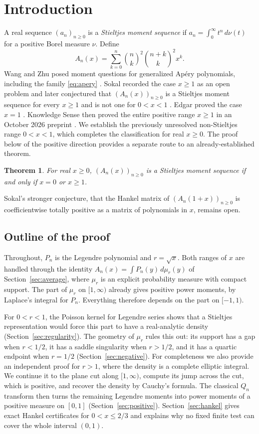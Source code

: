 \documentclass[11pt]{article}
\newtheorem{theorem}{Theorem}
\begin{document}
\section{Introduction}
A real sequence $(a_n)_{n\ge0}$ is a \emph{Stieltjes moment sequence} if
$a_n=\int_0^\infty t^n\,d\nu(t)$ for a positive Borel measure $\nu$.
Define
\begin{equation}\label{eq:apery}
 A_n(x)=\sum_{k=0}^n\binom nk^2\binom{n+k}k^2x^k.
\end{equation}
Wang and Zhu posed moment questions for generalized Ap\'ery polynomials,
including the family \eqref{eq:apery} \cite[Section 5]{WangZhu}.
Sokal recorded the case $x\ge1$ as an open problem \cite{Sokal2018} and
later conjectured that $(A_n(x))_{n\ge0}$ is a Stieltjes moment sequence
for every $x\ge1$ and is not one for $0<x<1$ \cite[slide 29]{Sokal}.
Edgar proved the case $x=1$ \cite{Edgar}. Knowledge Sense then proved
the entire positive range $x\ge1$ in an October 2026 preprint
\cite{KnowledgeSense}. We establish the previously unresolved
non-Stieltjes range $0<x<1$, which completes the classification
for real $x\ge0$. The proof below of the positive direction
provides a separate route to an already-established theorem.
\begin{theorem}\label{thm:classification}
For real $x\ge0$, $(A_n(x))_{n\ge0}$ is a Stieltjes moment sequence
if and only if $x=0$ or $x\ge1$.
\end{theorem}
Sokal's stronger conjecture, that the Hankel matrix of
$(A_n(1+x))_{n\ge0}$ is coefficientwise totally positive as a matrix of
polynomials in $x$, remains open.

\subsection{Outline of the proof}
Throughout, $P_n$ is the Legendre polynomial and $r=\sqrt{x}$. Both
ranges of $x$ are handled through the identity
$A_n(x)=\int P_n(y)\,d\mu_r(y)$ of Section~\ref{sec:average}, where
$\mu_r$ is an explicit probability measure with compact support. The part
of $\mu_r$ on $[1,\infty)$ already gives positive power moments, by
Laplace's integral for $P_n$. Everything therefore depends on the part
on $[-1,1)$.

For $0<r<1$, the Poisson kernel for Legendre series shows that a
Stieltjes representation would force this part to have a real-analytic
density (Section~\ref{sec:regularity}). The geometry of $\mu_r$ rules
this out: its support has a gap when $r<1/2$, it has a saddle
singularity when $r>1/2$, and it has a quartic endpoint when $r=1/2$
(Section~\ref{sec:negative}). For completeness we also provide an independent proof for $r>1$,
where the density is a complete elliptic integral. We continue it
to the plane cut along $[1,\infty)$,
compute its jump across the cut, which is positive, and recover the
density by Cauchy's formula. The classical $Q_n$ transform then turns the
remaining Legendre moments into power moments of a positive measure on
$[0,1]$ (Section~\ref{sec:positive}). Section~\ref{sec:hankel} gives
exact Hankel certificates for $0<x\le2/3$ and explains why no fixed
finite test can cover the whole interval $(0,1)$.
\end{document}
